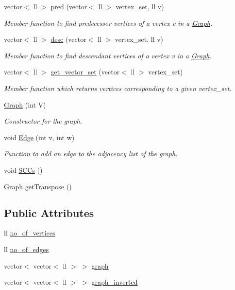 \begin{DoxyCompactItemize}
vector$<$ ll $>$ \hyperlink{classGraph_aa9bb861babacf50c211afc72b5f424fb}{pred} (vector$<$ ll $>$ vertex\+\_\+set, ll v)
\begin{DoxyCompactList}\small\item\em Member function to find predecessor vertices of a vertex v in a \hyperlink{classGraph}{Graph}. \end{DoxyCompactList}\item 
vector$<$ ll $>$ \hyperlink{classGraph_a322040982fd02ab16e2a70b0f9c6758a}{desc} (vector$<$ ll $>$ vertex\+\_\+set, ll v)
\begin{DoxyCompactList}\small\item\em Member function to find descendant vertices of a vertex v in a \hyperlink{classGraph}{Graph}. \end{DoxyCompactList}\item 
vector$<$ ll $>$ \hyperlink{classGraph_ab374b601113c5afe1d6d81c72ccb1fa4}{get\+\_\+vector\+\_\+set} (vector$<$ ll $>$ vertex\+\_\+set)
\begin{DoxyCompactList}\small\item\em Member function which returns vertices corresponding to a given vertex\+\_\+set. \end{DoxyCompactList}\item 
\hyperlink{classGraph_af3ff6b295df8bf3bee0bafd7c7d56915}{Graph} (int V)
\begin{DoxyCompactList}\small\item\em Constructor for the graph. \end{DoxyCompactList}\item 
void \hyperlink{classGraph_ab180d5a83c57804753fe55717377c03d}{Edge} (int v, int w)
\begin{DoxyCompactList}\small\item\em Function to add an edge to the adjacency list of the graph. \end{DoxyCompactList}\item 
void \hyperlink{classGraph_a985f12be7d4281d54d61cba720894e58}{S\+C\+Cs} ()
\item 
\hyperlink{classGraph}{Graph} \hyperlink{classGraph_abdaf0cb08811d4b30f4c85f632e0e181}{get\+Transpose} ()
\end{DoxyCompactItemize}
\subsection*{Public Attributes}
\begin{DoxyCompactItemize}
\item 
ll \hyperlink{classGraph_a9b23a1ce91eceed3856b453858e61a05}{no\+\_\+of\+\_\+vertices}
\item 
ll \hyperlink{classGraph_a49735f451a8a2cd7ae8334df2adb42cf}{no\+\_\+of\+\_\+edges}
\item 
vector$<$ vector$<$ ll $>$ $>$ \hyperlink{classGraph_ab8435b2eb808e20c78688da1818a3a8a}{graph}
\item 
vector$<$ vector$<$ ll $>$ $>$ \hyperlink{classGraph_ab0d5142a7def6b33069b6dbaba9fdf1c}{graph\+\_\+inverted}
\end{DoxyCompactItemize}


